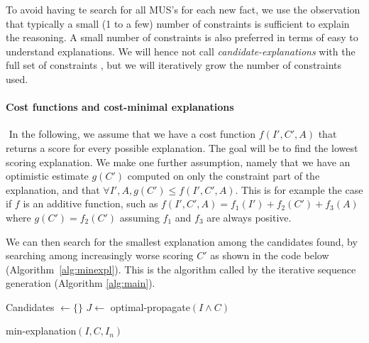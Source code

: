 
To avoid having te search for all MUS's for each new fact, we use the observation that typically a small (1 to a few) number of constraints is sufficient to explain the reasoning. A small number of constraints is also preferred in terms of easy to understand explanations. We will hence not call \textit{candidate-explanations} with the full set of constraints \allconstraints, but we will iteratively grow the number of constraints used. 

\paragraph{Cost functions and cost-minimal explanations}
$ $   
In the following, we assume that we have a cost function $f(I', C', A)$ that returns a score for every possible explanation. The goal will be to find the lowest scoring explanation. We make one further assumption, namely that we have an optimistic estimate $g(C')$ computed on only the constraint part of the explanation, and that $\forall I', A, g(C') \leq f(I', C', A)$. This is for example the case if $f$ is an additive function, such as $f(I', C', A) = f_1(I') + f_2(C') + f_3(A)$ where $g(C') = f_2(C')$ assuming $f_1$ and $f_3$ are always positive.

We can then search for the smallest explanation among the candidates found, by searching among increasingly worse scoring $C'$ as shown in the code below (Algorithm~\ref{alg:minexpl}). This is the algorithm called by the iterative sequence generation (Algorithm \ref{alg:main}).

\begin{algorithm}


  Candidates $\gets \{\}$\;
  $J \gets$ optimal-propagate$(I \wedge C)$\;
\caption{min-explanation$(I,C,I_n)$}
\label{alg:minexpl}
\end{algorithm}

